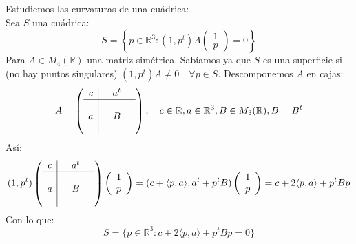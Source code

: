 \begin{ejemplo}
    \noindent
    Estudiemos las curvaturas de una cuádrica:\\

    \noindent
    Sea $S$ una cuádrica:
    \begin{equation*}
        S = \left\{p\in \mathbb{R}^3 : (1,p^t) A \left(\begin{array}{cc}
            1 \\
            p 
        \end{array}\right) = 0\right\}
    \end{equation*}
    Para $A\in M_4(\mathbb{R})$ una matriz simétrica. Sabíamos ya que $S$ es una superficie si (no hay puntos singulares) $(1,p^t)A\neq 0\quad \forall p\in S$. Descomponemos $A$ en cajas:
    \begin{equation*}
        A = \left(\begin{array}{c|ccc}
            c &  & a^t &  \\
            \hline
              &  &  &  \\
            a &  & B &  \\
              &  &  &  
        \end{array}\right), \quad c\in \mathbb{R}, a\in \mathbb{R}^3, B\in M_3(\mathbb{R}), B=B^t
    \end{equation*}
    Así:
    \begin{equation*}
        (1, p^t) \left(\begin{array}{c|ccc}
            c &  & a^t &  \\
            \hline
              &  &  &  \\
            a &  & B &  \\
              &  &  &  
        \end{array}\right)\left(\begin{array}{cc}
            1 \\
            p 
        \end{array}\right) = (c + \langle p,a \rangle, a^t + p^tB)\left(\begin{array}{cc}
            1 \\
            p 
        \end{array}\right) = c+2\langle p,a \rangle + p^tBp
    \end{equation*}
    Con lo que:
    \begin{equation*}
        S = \{p\in \mathbb{R}^3 : c + 2\langle p,a \rangle +p^tBp = 0\}
    \end{equation*}

\end{ejemplo}
